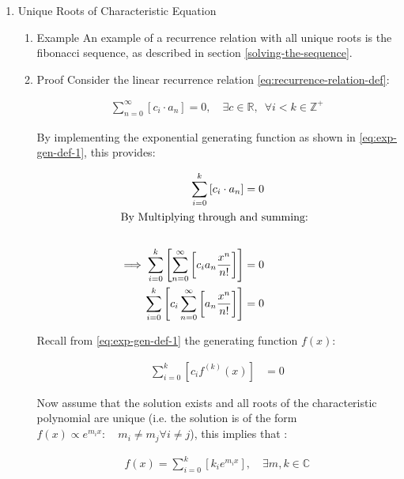 \documentclass[11pt]{article}
\begin{document}
\begin{enumerate}
\item Unique Roots of Characteristic Equation
\label{uniq-roots-recurrence}
\begin{enumerate}
\item Example
\label{sec:org719b18c}
An example of a recurrence relation with all unique roots is the fibonacci sequence, as described in section \ref{solving-the-sequence}.
\item Proof
\label{sec:orgb825d41}
Consider the linear recurrence relation \eqref{eq:recurrence-relation-def}:

\begin{align}
\sum^{\infty}_{n= 0}   \left[ c_i \cdot  a_n \right] = 0, \quad \exists c \in
\mathbb{R}, \enspace \forall i<k\in\mathbb{Z}^+ \nonumber
\end{align}

By implementing the exponential generating function as shown in \eqref{eq:exp-gen-def-1}, this provides:


\begin{align}
    \sum^{k}_{i= 0}   {\left[{ c_i \cdot a_n } \right]} = 0 \nonumber \\
    \intertext{By Multiplying through and summing: } \notag \\
     \implies  \sum^{k}_{i= 0}   {\left[{ \sum^{\infty}_{n= 0}   {\left[{ c_i a_n \frac{x^n}{n!} }\right]}  }\right]}  \nonumber = 0 \\
     \sum^{k}_{i= 0}    {\left[{ c_i \sum^{\infty}_{n= 0}   {\left[{  a_n \frac{x^n}{n!} }\right]}  }\right]}  \nonumber = 0 \\
\end{align}

Recall from \eqref{eq:exp-gen-def-1} the generating function \(f{\left({ x }\right)}\):

\begin{align}
\sum^{k}_{i= 0}   {\left[{ c_i f^{{\left({ k }\right)} } } {\left({ x }\right)} \right]} \label{eq:exp-gen-def-proof}  &= 0
\end{align}


Now assume that the solution exists and all roots of the characteristic polynomial are unique (i.e. the solution is of the form \(f{\left({ x }\right)} \propto e^{m_i x}: \quad m_i \neq m_j \forall i\neq j\)), this implies that  \cite[Ch. 4]{zillDifferentialEquations2009a} :

\begin{align}
    f{\left({ x }\right)} = \sum^{k}_{i= 0}   {\left[{ k_i e^{m_i x} }\right]}, \quad \exists m,k \in \mathbb{C} \nonumber
\end{align}


\end{enumerate}
\end{enumerate}
\end{document}
